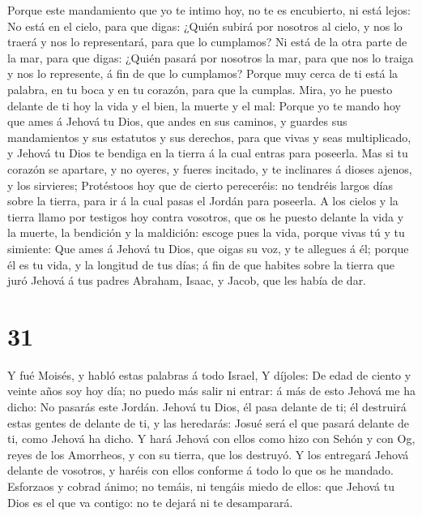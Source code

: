  Porque este mandamiento que yo te intimo hoy, no te es
encubierto, ni está lejos:  No está en el cielo, para que
digas: ¿Quién subirá por nosotros al cielo, y nos lo traerá y nos lo
representará, para que lo cumplamos?  Ni está de la otra
parte de la mar, para que digas: ¿Quién pasará por nosotros la mar, para
que nos lo traiga y nos lo represente, á fin de que lo cumplamos?
 Porque muy cerca de ti está la palabra, en tu boca y en tu
corazón, para que la cumplas.  Mira, yo he puesto delante
de ti hoy la vida y el bien, la muerte y el mal:  Porque yo
te mando hoy que ames á Jehová tu Dios, que andes en sus caminos, y
guardes sus mandamientos y sus estatutos y sus derechos, para que vivas
y seas multiplicado, y Jehová tu Dios te bendiga en la tierra á la cual
entras para poseerla.  Mas si tu corazón se apartare, y no
oyeres, y fueres incitado, y te inclinares á dioses ajenos, y los
sirvieres;  Protéstoos hoy que de cierto pereceréis: no
tendréis largos días sobre la tierra, para ir á la cual pasas el Jordán
para poseerla.  A los cielos y la tierra llamo por testigos
hoy contra vosotros, que os he puesto delante la vida y la muerte, la
bendición y la maldición: escoge pues la vida, porque vivas tú y tu
simiente:  Que ames á Jehová tu Dios, que oigas su voz, y
te allegues á él; porque él es tu vida, y la longitud de tus días; á fin
de que habites sobre la tierra que juró Jehová á tus padres Abraham,
Isaac, y Jacob, que les había de dar.

\hypertarget{section-30}{%
\section{31}\label{section-30}}

 Y fué Moisés, y habló estas palabras á todo Israel,
 Y díjoles: De edad de ciento y veinte años soy hoy día; no
puedo más salir ni entrar: á más de esto Jehová me ha dicho: No pasarás
este Jordán.  Jehová tu Dios, él pasa delante de ti; él
destruirá estas gentes de delante de ti, y las heredarás: Josué será el
que pasará delante de ti, como Jehová ha dicho.  Y hará
Jehová con ellos como hizo con Sehón y con Og, reyes de los Amorrheos, y
con su tierra, que los destruyó.  Y los entregará Jehová
delante de vosotros, y haréis con ellos conforme á todo lo que os he
mandado.  Esforzaos y cobrad ánimo; no temáis, ni tengáis
miedo de ellos: que Jehová tu Dios es el que va contigo: no te dejará ni
te desamparará.


